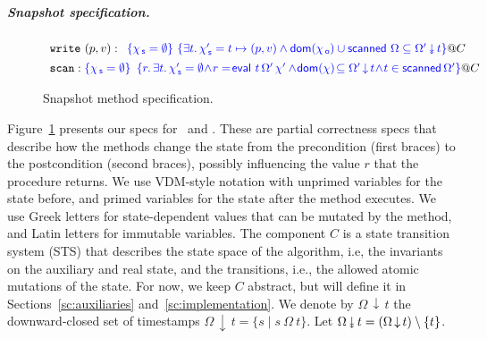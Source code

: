 \documentclass[a4paper,UKenglish]{lipics-v2016}
\newcommand{\dom}[1]{\mathsf{dom}(#1)}
\newcommand{\selfsub}{\mathsf{s}}
\newcommand{\othersub}{\mathsf{o}}
\newcommand{\hist}{\chi}
\newcommand{\histS}{\hist_{\, \selfsub}}
\newcommand{\histO}{\hist_{\, \othersub}}
\newcommand{\hempty}{\emptyset}
\newcommand{\ldot}{\mathord{.}\,}
\newcommand{\stableorder}{\Omega}
\newcommand{\stableorderP}{\stableorder'}
\newcommand{\histP}{\chi'}
\newcommand{\histSP}{\hist_{\, \selfsub}'}
\newcommand{\tsPre}[1]{\ensuremath{{\textcolor{blue}{#1}}}}
\newcommand{\tsPos}[1]{\ensuremath{\textcolor{blue}{#1}}}
\theoremstyle{definition}
\begin{document}
\subparagraph*{Snapshot specification.}


\def\chain{\mathsf{chain}}
\def\eval{\mathsf{eval}}

\newcommand\myddarrow{\mathrel{\rotatebox[origin=c]{270}{$\twoheadrightarrow$}}}
\newcommand{\sideal}[2]{#1\,{\myddarrow}\,#2}
\newcommand{\ideal}[2]{#1\,{\downarrow}\,#2}

\begin{figure}[t]
%
\centering
\[
\begin{array}{l}
\mathtt{write}\ (p, v) : %
\begin{array}[t]{l}
\tsPre{\{\histS = \hempty\}}\
\tsPos{\{\exists t\ldot \histS' = t \mapsto (p, v) \wedge
    \dom {\histO} \cup \scanned\, \stableorder
       \subseteq \sideal{\stableorderP}{t}\}} @ C %
\end{array}\\[5pt]
%
\mathtt{scan} : 
\tsPre{\{\histS = \hempty\}}\ 
\!\!\begin{array}[t]{l}
\tsPos{\{r\ldot \exists t\ldot \histSP = \hempty\! \wedge\!
   r =\! \eval\ t\, {\stableorderP}\, {\histP} \wedge\!
  \dom{\hist}\! \subseteq \ideal{\stableorderP}{t}\! \wedge\!
  t \in \scanned{\stableorderP}\}} @ C %
\end{array}
\end{array}
\]
\caption{\label{fig:specs} Snapshot method specification.}
\end{figure}

%
Figure~\ref{fig:specs} presents our specs for \jyscan~and
\jywrite. These are partial correctness specs that describe how
the methods change the state from the precondition (first braces) to
the postcondition (second braces), possibly influencing the value $r$
that the procedure returns. We use VDM-style notation with unprimed
variables for the state before, and primed variables for the state
after the method executes. We use Greek letters for state-dependent
values that can be mutated by the method, and Latin letters for
immutable variables.
%
The component $C$ is a state transition system (STS) that describes the
state space of the algorithm, i.e, the invariants on the auxiliary and
real state, and the transitions, i.e., the allowed atomic mutations of
the state. For now, we keep $C$ abstract, but will define it in
Sections~\ref{sc:auxiliaries} and~\ref{sc:implementation}.
%
We denote by $\ideal{\stableorder}{t}$ the downward-closed set of
timestamps
$\ideal{\stableorder}{t} = \{ s \mid s\ {\stableorder}\ t \}$. Let
$\sideal{\stableorder}{t} = (\ideal{\stableorder}{t})\setminus\{t\}$.
\end{document}
